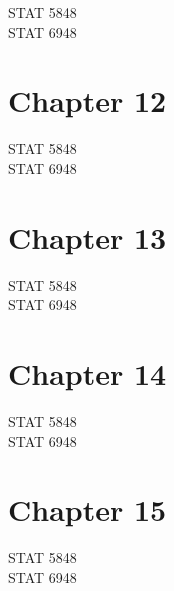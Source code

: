 \documentclass[11pt]{article}
\begin{document}
\begin{description}
\item[STAT 5848] 
\item[STAT 6948] 
\end{description}
\section{Chapter 12}
\label{sec-12}

\begin{description}
\item[STAT 5848] 
\item[STAT 6948] 
\end{description}
\section{Chapter 13}
\label{sec-13}

\begin{description}
\item[STAT 5848] 
\item[STAT 6948] 
\end{description}
\section{Chapter 14}
\label{sec-14}

\begin{description}
\item[STAT 5848] 
\item[STAT 6948] 
\end{description}
\section{Chapter 15}
\label{sec-15}

\begin{description}
\item[STAT 5848] 
\item[STAT 6948] 
\end{description}
\end{document}
